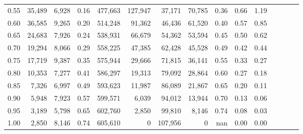 \begin{tabular}{rrrcrrrrrrrrrrr}
0.55 &  35,489 &  6,928 &                                       0.16 &  477,663 &  127,947 &   37,171 &   70,785 &  0.36 &  0.66 &                         1.19 \\
0.60 &  36,585 &  9,265 &                                       0.20 &  514,248 &   91,362 &   46,436 &   61,520 &  0.40 &  0.57 &                         0.85 \\
0.65 &  24,683 &  7,926 &                                       0.24 &  538,931 &   66,679 &   54,362 &   53,594 &  0.45 &  0.50 &                         0.62 \\
0.70 &  19,294 &  8,066 &                                       0.29 &  558,225 &   47,385 &   62,428 &   45,528 &  0.49 &  0.42 &                         0.44 \\
0.75 &  17,719 &  9,387 &                                       0.35 &  575,944 &   29,666 &   71,815 &   36,141 &  0.55 &  0.33 &                         0.27 \\
0.80 &  10,353 &  7,277 &                                       0.41 &  586,297 &   19,313 &   79,092 &   28,864 &  0.60 &  0.27 &                         0.18 \\
0.85 &   7,326 &  6,997 &                                       0.49 &  593,623 &   11,987 &   86,089 &   21,867 &  0.65 &  0.20 &                         0.11 \\
0.90 &   5,948 &  7,923 &                                       0.57 &  599,571 &    6,039 &   94,012 &   13,944 &  0.70 &  0.13 &                         0.06 \\
0.95 &   3,189 &  5,798 &                                       0.65 &  602,760 &    2,850 &   99,810 &    8,146 &  0.74 &  0.08 &                         0.03 \\
1.00 &   2,850 &  8,146 &                                       0.74 &  605,610 &        0 &  107,956 &        0 &   nan &  0.00 &                         0.00 \\
\bottomrule
\end{tabular}
